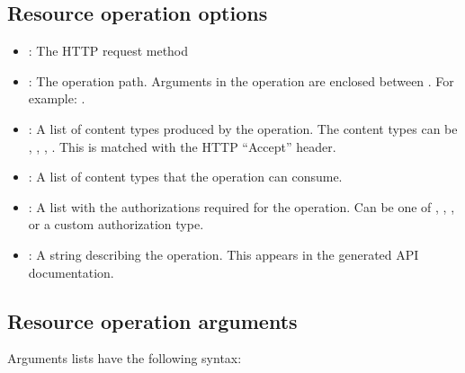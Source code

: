 \documentclass[letterpaper,10pt,english]{sphinxmanual}
\begin{document}
\subsection{Resource operation options}
\label{\detokenize{api:resource-operation-options}}\begin{itemize}
\item {} 
: The HTTP request method

\item {} 
: The operation path. Arguments in the operation are enclosed between \sphinxcode{\sphinxupquote{\{\}}}. For example: .

\item {} 
: A list of content types produced by the operation. The content types can be , , , . This is matched with the HTTP “Accept” header.

\item {} 
: A list of content types that the operation can consume.

\item {} 
: A list with the authorizations required for the operation. Can be one of , , , or a custom authorization type.

\item {} 
: A string describing the operation. This appears in the generated API documentation.

\end{itemize}


\subsection{Resource operation arguments}
\label{\detokenize{api:resource-operation-arguments}}
Arguments lists have the following syntax:

\begin{sphinxVerbatim}[commandchars=\\\{\}]
  
\end{sphinxVerbatim}
\end{document}

